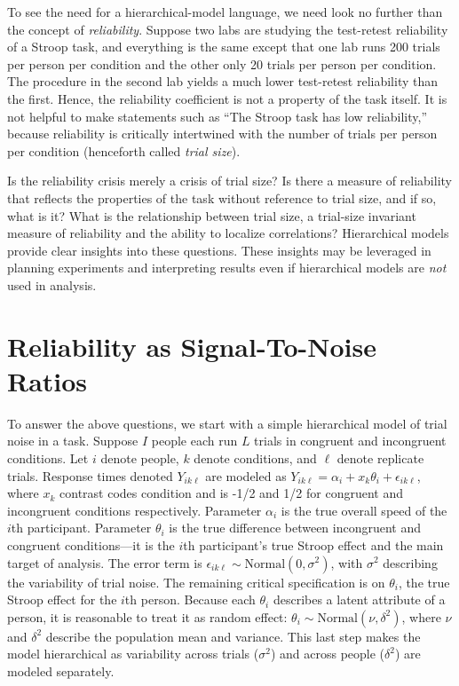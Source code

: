 \documentclass[
  ,man]{apa6}
\begin{document}
To see the need for a hierarchical-model language, we need look no further than the concept of \emph{reliability}. Suppose two labs are studying the test-retest reliability of a Stroop task, and everything is the same except that one lab runs 200 trials per person per condition and the other only 20 trials per person per condition. The procedure in the second lab yields a much lower test-retest reliability than the first. Hence, the reliability coefficient is not a property of the task itself. It is not helpful to make statements such as ``The Stroop task has low reliability,'' because reliability is critically intertwined with the number of trials per person per condition (henceforth called \emph{trial size}).

Is the reliability crisis merely a crisis of trial size? Is there a measure of reliability that reflects the properties of the task without reference to trial size, and if so, what is it? What is the relationship between trial size, a trial-size invariant measure of reliability and the ability to localize correlations? Hierarchical models provide clear insights into these questions. These insights may be leveraged in planning experiments and interpreting results even if hierarchical models are \emph{not} used in analysis.

\hypertarget{reliability-as-signal-to-noise-ratios}{%
\section{Reliability as Signal-To-Noise Ratios}\label{reliability-as-signal-to-noise-ratios}}

To answer the above questions, we start with a simple hierarchical model of trial noise in a task. Suppose \(I\) people each run \(L\) trials in congruent and incongruent conditions. Let \(i\) denote people, \(k\) denote conditions, and \(\ell\) denote replicate trials. Response times denoted \(Y_{ik\ell}\) are modeled as \(Y_{ik\ell} = \alpha_i +x_k\theta_i+\epsilon_{ik\ell}\), where \(x_k\) contrast codes condition and is -1/2 and 1/2 for congruent and incongruent conditions respectively. Parameter \(\alpha_i\) is the true overall speed of the \(i\)th participant. Parameter \(\theta_i\) is the true difference between incongruent and congruent conditions---it is the \(i\)th participant's true Stroop effect and the main target of analysis. The error term is \(\epsilon_{ik\ell} \sim \mbox{Normal}(0,\sigma^2)\), with \(\sigma^2\) describing the variability of trial noise. The remaining critical specification is on \(\theta_i\), the true Stroop effect for the \(i\)th person. Because each \(\theta_i\) describes a latent attribute of a person, it is reasonable to treat it as random effect: \(\theta_i \sim \mbox{Normal}(\nu,\delta^2)\), where \(\nu\) and \(\delta^2\) describe the population mean and variance. This last step makes the model hierarchical as variability across trials (\(\sigma^2\)) and across people (\(\delta^2\)) are modeled separately.
\end{document}
